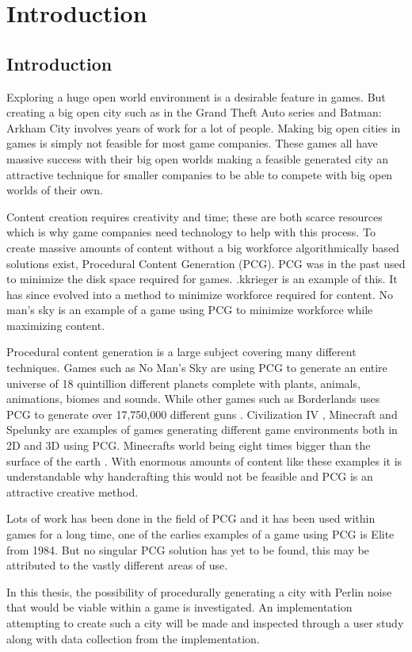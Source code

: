\section{Introduction}
	\subsection{Introduction}
	Exploring a huge open world environment is a desirable feature in games. But creating a big open city such as in the Grand Theft Auto series and Batman: Arkham City involves years of work for a lot of people. Making big open cities in games is simply not feasible for most game companies. These games all have massive success with their big open worlds making a feasible generated city an attractive technique for smaller companies to be able to compete with big open worlds of their own.
	\par
	Content creation requires creativity and time; these are both scarce resources which is why game companies need technology to help with this process.
	To create massive amounts of content without a big workforce algorithmically based solutions exist, Procedural Content Generation (PCG). PCG was in the past used to minimize the disk space required for games. .kkrieger is an  example of this. It has since evolved into a method to minimize workforce required for content. No man’s sky is an example of a game using PCG to minimize workforce while maximizing content.
	\par
	Procedural content generation is a large subject covering many different techniques. Games such as No Man's Sky \cite{NoMansSky} are using PCG to generate an entire universe of 18 quintillion \cite{NoMansSkyplanets} different planets complete with plants, animals, animations, biomes and sounds. While other games such as Borderlands \cite{Borderlands} uses PCG to generate over 17,750,000 different guns \cite{BorderlandsWeapons}. Civilization IV \cite{CivilizationCompany}, Minecraft \cite{Minecraft} and Spelunky \cite{Spelunky} are examples of games generating different game environments both in 2D and 3D using PCG. Minecrafts world being eight times bigger than the surface of the earth \cite{MinecraftSize}. With enormous amounts of content like these examples it is understandable why handcrafting this would not be feasible and PCG is an attractive creative method.
	\par
	Lots of work has been done in the field of PCG and it has been used within games for a long time, one of the earlies examples of a game using PCG is Elite \cite{Elite} from 1984. But no singular PCG solution has yet to be found, this may be attributed to the vastly different areas of use.
	\par
	In this thesis, the possibility of procedurally generating a city with Perlin noise that would be viable within a game is investigated. An implementation attempting to create such a city will be made and inspected through a user study along with data collection from the implementation.
	

